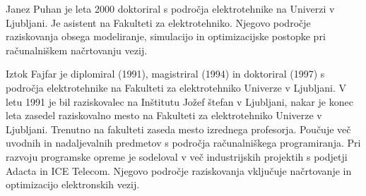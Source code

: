 \documentclass[journal,a4paper,twoside]{sty/IEEEtran}
\begin{document}

\begin{IEEEbiographynophoto}{Janez Puhan} je leta 2000 doktoriral s področja elektrotehnike na Univerzi v Ljubljani. Je asistent na Fakulteti za elektrotehniko. Njegovo področje raziskovanja obsega modeliranje, simulacijo in optimizacijske postopke pri računalniškem načrtovanju vezij.
\end{IEEEbiographynophoto}

\begin{IEEEbiographynophoto}{Iztok Fajfar} je diplomiral (1991), magistriral (1994) in doktoriral (1997) s področja elektrotehnike na Fakulteti za elektrotehniko Univerze v Ljubljani. V letu 1991 je bil raziskovalec na Inštitutu Jožef štefan v Ljubljani, nakar je konec leta zasedel raziskovalno mesto na Fakulteti za elektrotehniko Univerze v Ljubljani. 
Trenutno na fakulteti zaseda mesto izrednega profesorja. Poučuje več uvodnih in nadaljevalnih predmetov s področja računalniškega programiranja. Pri razvoju programske opreme je sodeloval v več industrijskih projektih s podjetji Adacta in ICE Telecom. Njegovo področje raziskovanja vključuje načrtovanje in optimizacijo elektronskih vezij.
\end{IEEEbiographynophoto}
\end{document}
